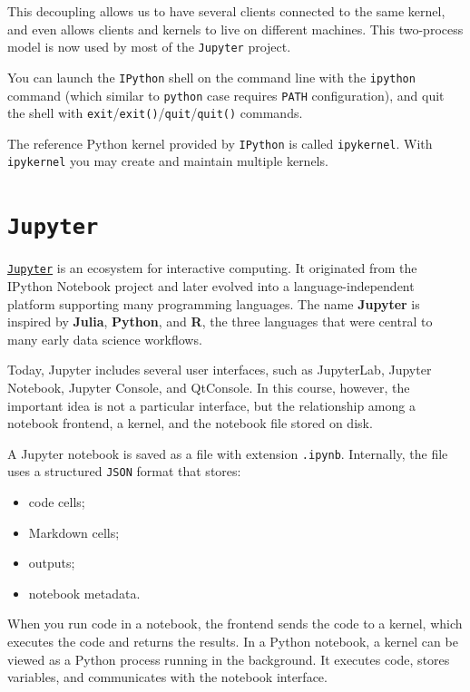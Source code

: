 \documentclass[
  letterpaper,
  DIV=11,
  numbers=noendperiod]{scrreprt}
\providecommand{\tightlist}{%
  \setlength{\itemsep}{0pt}\setlength{\parskip}{0pt}}
\theoremstyle{definition}
\theoremstyle{definition}
\theoremstyle{plain}
\theoremstyle{plain}
\theoremstyle{remark}
\begin{document}
This decoupling allows us to have several clients connected to the same
kernel, and even allows clients and kernels to live on different
machines. This two-process model is now used by most of the
\texttt{Jupyter} project.

You can launch the \texttt{IPython} shell on the command line with the
\texttt{ipython} command (which similar to \texttt{python} case requires
\texttt{PATH} configuration), and quit the shell with
\texttt{exit}/\texttt{exit()}/\texttt{quit}/\texttt{quit()} commands.

The reference Python kernel provided by \texttt{IPython} is called
\texttt{ipykernel}. With \texttt{ipykernel} you may create and maintain
multiple kernels.

\section{\texorpdfstring{\texttt{Jupyter}}{Jupyter}}\label{jupyter}

\href{https://docs.jupyter.org/en/latest/projects/architecture/content-architecture.html}{\texttt{Jupyter}}
is an ecosystem for interactive computing. It originated from the
IPython Notebook project and later evolved into a language-independent
platform supporting many programming languages. The name
\textbf{Jupyter} is inspired by \textbf{Julia}, \textbf{Python}, and
\textbf{R}, the three languages that were central to many early data
science workflows.

Today, Jupyter includes several user interfaces, such as JupyterLab,
Jupyter Notebook, Jupyter Console, and QtConsole. In this course,
however, the important idea is not a particular interface, but the
relationship among a notebook frontend, a kernel, and the notebook file
stored on disk.

A Jupyter notebook is saved as a file with extension \texttt{.ipynb}.
Internally, the file uses a structured \texttt{JSON} format that stores:

\begin{itemize}
\tightlist
\item
  code cells;
\item
  Markdown cells;
\item
  outputs;
\item
  notebook metadata.
\end{itemize}

When you run code in a notebook, the frontend sends the code to a
kernel, which executes the code and returns the results. In a Python
notebook, a kernel can be viewed as a Python process running in the
background. It executes code, stores variables, and communicates with
the notebook interface.
\end{document}

